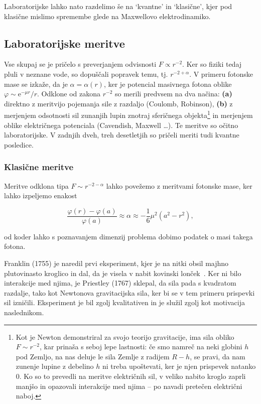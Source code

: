 \documentclass[a4paper, twocolumn, titlepage]{article}
\begin{document}
Laboratorijske lahko nato razdelimo še na `kvantne' in `klasične', kjer pod klasične mislimo spremembe glede na Maxwellovo
elektrodinamiko.

\subsection{Laboratorijske meritve}

Vse skupaj se je pričelo s preverjanjem odvisnosti $F \propto r^{-2}$. Ker so fiziki tedaj pluli v neznane vode, so dopuščali
popravek temu, tj. $r^{-2 + \alpha}$. V primeru fotonske mase se izkaže, da je $\alpha = \alpha (r)$, ker je potencial masivnega
fotona oblike $\varphi \sim \text{e}^{-\mu r}/r$. Odklone od zakona $r^{-2}$ so merili predvsem na dva načina: \textbf{(a)} direktno
z meritvijo pojemanja sile z razdaljo (Coulomb, Robinson), \textbf{(b)} z merjenjem odsotnosti sil zunanjih lupin znotraj
sferičnega objekta\footnote{Kot je Newton demonstriral za svojo teorijo gravitacije, ima sila obliko $F \sim r^{-2}$, kar prinaša s
seboj lepe lastnosti: če smo namreč na neki globini $h$ pod Zemljo, na nas deluje le sila Zemlje z radijem $R - h$, se pravi, da
nam zunenje lupine z debelino $h$ ni treba upoštevati, ker je njen prispevek natanko 0. Ko so to prevedli na meritve električnih
sil, v veliko nabito kroglo zaprli manjšo in opazovali interakcije med njima -- po navadi pretečen električni naboj.} in
merjenjem oblike električnega potenciala (Cavendish, Maxwell \ldots). Te meritve so očitno laboratorijske. V zadnjih dveh, treh
desetletjih so pričeli meriti tudi kvantne posledice.

\subsubsection{Klasične meritve}

Meritve odklona tipa $F \sim r^{-2 - \alpha}$ lahko povežemo z meritvami fotonske mase, ker lahko izpeljemo enakost~\cite{over}

\begin{equation}
	\frac{\varphi(r) - \varphi(a)}{\varphi(a)} \approx \alpha \approx -\frac{1}{6}\mu^2(a^2 - r^2),
\end{equation}

od koder lahko s poznavanjem dimenzij problema dobimo podatek o masi takega fotona.

Franklin (1755) je naredil prvi eksperiment, kjer je na nitki obsil majhno plutovinasto kroglico in dal, da je visela v nabit
kovinski lonček~\cite{over}. Ker ni bilo interakcije med njima, je Priestley (1767) sklepal, da sila pada s kvadratom razdalje,
tako kot Newtonova gravitacijska sila, ker bi se v tem primeru prispevki sil izničili. Eksperiment je bil zgolj kvalitativen in je
služil zgolj kot motivacija naslednikom.
\end{document}
